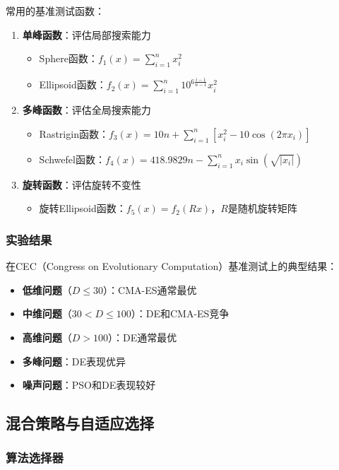 常用的基准测试函数：
\begin{enumerate}
    \item \textbf{单峰函数}：评估局部搜索能力
    \begin{itemize}
        \item Sphere函数：$f_1(x) = \sum_{i=1}^n x_i^2$
        \item Ellipsoid函数：$f_2(x) = \sum_{i=1}^n 10^{6\frac{i-1}{n-1}} x_i^2$
    \end{itemize}
    
    \item \textbf{多峰函数}：评估全局搜索能力
    \begin{itemize}
        \item Rastrigin函数：$f_3(x) = 10n + \sum_{i=1}^n [x_i^2 - 10\cos(2\pi x_i)]$
        \item Schwefel函数：$f_4(x) = 418.9829n - \sum_{i=1}^n x_i \sin(\sqrt{|x_i|})$
    \end{itemize}
    
    \item \textbf{旋转函数}：评估旋转不变性
    \begin{itemize}
        \item 旋转Ellipsoid函数：$f_5(x) = f_2(Rx)$，$R$是随机旋转矩阵
    \end{itemize}
\end{enumerate}

\subsubsection{实验结果}

在CEC（Congress on Evolutionary Computation）基准测试上的典型结果：
\begin{itemize}
    \item \textbf{低维问题}（$D \leq 30$）：CMA-ES通常最优
    \item \textbf{中维问题}（$30 < D \leq 100$）：DE和CMA-ES竞争
    \item \textbf{高维问题}（$D > 100$）：DE通常最优
    \item \textbf{多峰问题}：DE表现优异
    \item \textbf{噪声问题}：PSO和DE表现较好
\end{itemize}

\subsection{混合策略与自适应选择}

\subsubsection{算法选择器}

